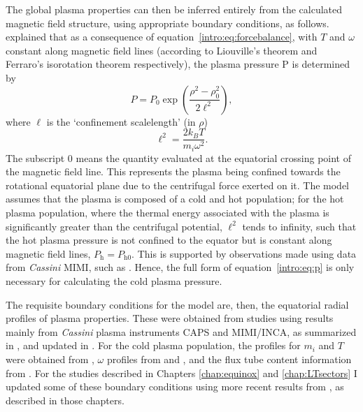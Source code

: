 {The global plasma properties can then be inferred entirely from the calculated magnetic field structure, using appropriate boundary conditions, as follows. \citet{caudal1986} explained that as a consequence of equation~\ref{intro:eq:forcebalance}, with $T$ and $\omega$ constant along magnetic field lines (according to Liouville's theorem and Ferraro's isorotation theorem respectively), the plasma pressure P is determined by 
\begin{equation}\label{intro:eq:p}
P = P_{0}\exp\left(\frac{\rho^2-\rho_0^2}{2\ell^2}\right),
\end{equation}
where $\ell$ is the `confinement scalelength' (in $\rho$)
\begin{equation}
\ell^2 = \frac{2k_BT}{m_i\omega^2}.
\end{equation}
The subscript 0 means the quantity evaluated at the equatorial crossing point of the magnetic field line. This represents the plasma being confined towards the rotational equatorial plane due to the centrifugal force exerted on it. The model assumes that the plasma is composed of a cold and hot population; for the hot plasma population, where the thermal energy associated with the plasma is significantly greater than the centrifugal potential, $\ell^2$ tends to infinity, such that the hot plasma pressure is not confined to the equator but is constant along magnetic field lines, $P_\mathrm{h} = P_\mathrm{h0}$. This is supported by observations made using data from \textit{Cassini} MIMI, such as \citet{krimigis2007}. Hence, the full form of equation~\ref{intro:eq:p} is only necessary for calculating the cold plasma pressure.

The requisite boundary conditions for the model are, then, the equatorial radial profiles of plasma properties. These were obtained from studies using results mainly from \textit{Cassini} plasma instruments CAPS and MIMI/INCA, as summarized in \citet{achilleos2010a}, and updated in \citet{achilleos2010b}. For the cold plasma population, the profiles for $m_i$ and $T$ were obtained from \citet{wilson2008}, $\omega$ profiles from \citet{wilson2008} and \citet{kane2008}, and the flux tube content information from \citet{mcandrews2009}. For the studies described in Chapters \ref{chap:equinox} and \ref{chap:LTsectors} I updated some of these boundary conditions using more recent results from \citet{wilson2017}, as described in those chapters.

}
